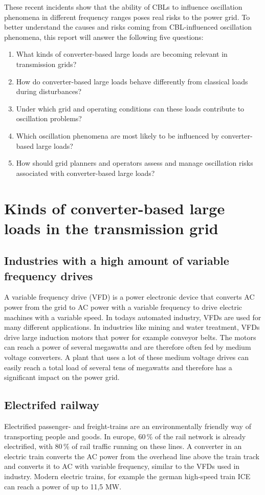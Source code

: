 \documentclass[conference]{IEEEtran}
\begin{document}
These recent incidents show that the ability of CBLs to influence oscillation phenomena in different frequency ranges poses real risks to the power grid. To better understand the causes and risks coming from CBL-influenced oscillation phenomena, this report will answer the following five questions:

\begin{enumerate}
    \item What kinds of converter-based large loads are becoming relevant in transmission grids?
    \item How do converter-based large loads behave differently from classical loads during disturbances?
    \item Under which grid and operating conditions can these loads contribute to oscillation problems?
    \item Which oscillation phenomena are most likely to be influenced by converter-based large loads?
    \item How should grid planners and operators assess and manage oscillation risks associated with converter-based large loads?
\end{enumerate}


\section{Kinds of converter-based large loads in the transmission grid}
\subsection{Industries with a high amount of variable frequency drives}
A variable frequency drive (VFD) is a power electronic device that converts AC power from the grid to AC power with a variable frequency to drive electric machines with a variable speed. In todays automated industry, VFDs are used for many different applications. In industries like mining and water treatment, VFDs drive large induction motors that power for example conveyor belts. The motors can reach a power of several megawatts and are therefore often fed by medium voltage converters. A plant that uses a lot of these medium voltage drives can easily reach a total load of several tens of megawatts and therefore has a significant impact on the power grid.

\subsection{Electrifed railway}
Electrified passenger- and freight-trains are an environmentally friendly way of transporting people and goods. In europe, 60\,\% of the rail network is already electrified, with 80\,\% of rail traffic running on these lines\cite{rail}. A converter in an electric train converts the AC power from the overhead line above the train track and converts it to AC with variable frequency, similar to the VFDs used in industry. Modern electric trains, for example the german high-speed train ICE can reach a power of up to 11,5 MW\cite{ice}. 
\end{document}
